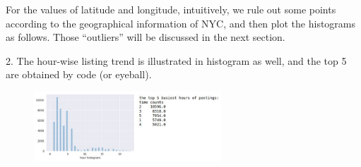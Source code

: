 \documentclass[10pt,twocolumn,letterpaper]{article}
\begin{document}
\begin{figure}[h!]%
    \centering
    \qquad
    \caption{}%
    \label{fig:example}%
\end{figure}

For the values of latitude and longitude, intuitively, we rule out some points according to the geographical information of NYC, and then plot the histograms as follows. Those “outliers” will be discussed in the next section.

\begin{figure}[h!]%
    \centering
    \qquad
    \caption{}%
    \label{fig:example}%
\end{figure}


2. The hour-wise listing trend is illustrated in histogram as well, and the top 5 are obtained by code (or eyeball).

\begin{figure}[h!]
    \centering
    \includegraphics[width=7cm]{CMPT459_Pair1.png}
    \caption{}
    \label{fig:galaxy}
\end{figure}
\end{document}
